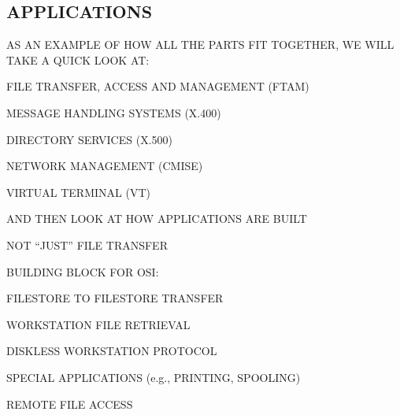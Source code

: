 \begin{bwslide}
\part	{APPLICATIONS}
\end{bwslide}


\begin{bwslide}

\begin{nrtc}
\item	AS AN EXAMPLE OF HOW ALL THE PARTS FIT TOGETHER,
	WE WILL TAKE A QUICK LOOK AT:
	\begin{nrtc}
	\item	FILE TRANSFER, ACCESS AND MANAGEMENT (FTAM)
	\item	MESSAGE HANDLING SYSTEMS (X.400)
	\item	DIRECTORY SERVICES (X.500)
	\item	NETWORK MANAGEMENT (CMISE)
	\item	VIRTUAL TERMINAL (VT)
	\end{nrtc}
\item	AND THEN LOOK AT HOW APPLICATIONS ARE BUILT
\end{nrtc}
\end{bwslide}


%




\begin{bwslide}

\begin{nrtc}
\item	NOT ``JUST'' FILE TRANSFER
\item	BUILDING BLOCK FOR OSI:
	\begin{nrtc}
	\item	FILESTORE TO FILESTORE TRANSFER
	\item	WORKSTATION FILE RETRIEVAL
	\item	DISKLESS WORKSTATION PROTOCOL
	\item	SPECIAL APPLICATIONS (e.g., PRINTING, SPOOLING)
	\item	REMOTE FILE ACCESS
	\end{nrtc}
\end{nrtc}
\end{bwslide}


